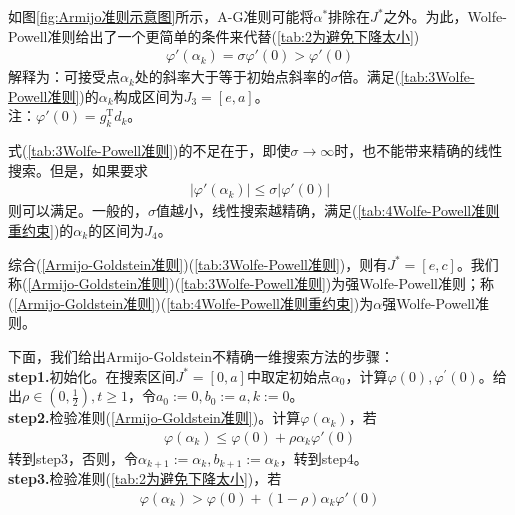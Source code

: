         \par
        如图\ref{fig:Armijo准则示意图}所示，A-G准则可能将$\alpha^*$排除在$J^*$之外。为此，Wolfe-Powell准则给出了一个更简单的条件来代替(\ref{tab:2为避免下降太小})
        \begin{align}\label{tab:3Wolfe-Powell准则}
        \varphi'({\alpha}_k) = \sigma {\varphi}'(0)> {\varphi}'(0)
        \end{align}
        解释为：可接受点$\alpha_k$处的斜率大于等于初始点斜率的$\sigma$倍。满足(\ref{tab:3Wolfe-Powell准则})的${\alpha}_k$构成区间为$J_3=[e,a]$。\\
        注：${\varphi}'(0)=g^\mathrm{T}_k d_k$。
        \par
        式(\ref{tab:3Wolfe-Powell准则})的不足在于，即使$\sigma \to \infty $时，也不能带来精确的线性搜索。但是，如果要求
        \begin{align}\label{tab:4Wolfe-Powell准则重约束}
        |{\varphi}'({\alpha}_k)| \leqslant \sigma |{\varphi}'(0)|
        \end{align}
        则可以满足。一般的，$\sigma$值越小，线性搜索越精确，满足(\ref{tab:4Wolfe-Powell准则重约束})的${\alpha}_k$的区间为$J_4$。
        \par
        综合(\ref{Armijo-Goldstein准则})(\ref{tab:3Wolfe-Powell准则})，则有$J^*=[e,c]$。我们称(\ref{Armijo-Goldstein准则})(\ref{tab:3Wolfe-Powell准则})为强Wolfe-Powell准则；称(\ref{Armijo-Goldstein准则})(\ref{tab:4Wolfe-Powell准则重约束})为$\alpha$强Wolfe-Powell准则。
        \par
        下面，我们给出Armijo-Goldstein不精确一维搜索方法的步骤：\\
        \textbf{step1.}初始化。在搜索区间$J^*=[0,a]$中取定初始点${\alpha}_0$，计算$\varphi(0),{\varphi}^{'}(0)$。给出$\rho \in (0,\frac 12),t \geqslant 1$，令$a_0:=0,b_0:=a,k:=0$。\\
        \textbf{step2.}检验准则(\ref{Armijo-Goldstein准则})。计算${\varphi}({\alpha}_k)$，若
                \begin{align*}
                \varphi({\alpha}_k) \leqslant \varphi(0)+\rho {\alpha}_k {\varphi}'(0)
                \end{align*}
                转到step3，否则，令${\alpha}_{k+1}:={\alpha}_k,b_{k+1}:={\alpha}_k$，转到step4。\\
        \textbf{step3.}检验准则(\ref{tab:2为避免下降太小})，若
                \begin{align*}
                \varphi({\alpha}_k) > \varphi(0)+(1-\rho) {\alpha}_k {\varphi}'(0)
                \end{align*}
